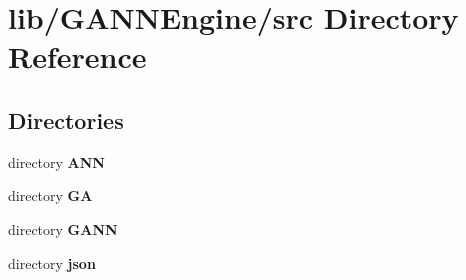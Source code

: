 \section{lib/\+G\+A\+N\+N\+Engine/src Directory Reference}
\label{dir_ce7080cace288ad7aea6b83e7e320e53}
\subsection*{Directories}
\begin{DoxyCompactItemize}
\item 
directory {\bf A\+N\+N}
\item 
directory {\bf G\+A}
\item 
directory {\bf G\+A\+N\+N}
\item 
directory {\bf json}
\end{DoxyCompactItemize}
